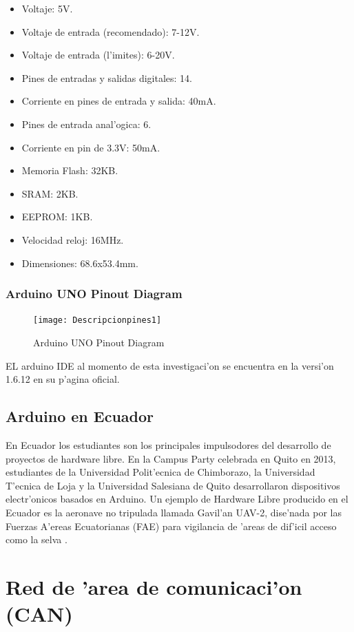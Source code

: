 \begin{itemize}
	\item Voltaje: 5V.
\item Voltaje de entrada (recomendado): 7-12V.
\item Voltaje de entrada (l'imites): 6-20V.
\item Pines de entradas y salidas digitales: 14.
\item Corriente en pines de entrada y salida: 40mA.
\item Pines de entrada anal'ogica: 6.
\item Corriente en pin de 3.3V: 50mA.
\item Memoria Flash: 32KB.
\item SRAM: 2KB.
\item EEPROM: 1KB.
\item Velocidad reloj: 16MHz.
\item Dimensiones: 68.6x53.4mm.
\end{itemize}

\subsubsection{Arduino UNO Pinout Diagram}
\begin{figure}[h]
	\centering
		\texttt{[image: Descripcionpines1]}
	\caption{Arduino UNO Pinout Diagram}
	\label{fig:Descripcionpines}
\end{figure}
EL arduino IDE al momento de esta investigaci'on se encuentra en la versi'on 1.6.12 en su p'agina oficial.

\subsection{Arduino en Ecuador}
En Ecuador los estudiantes son los principales impulsodores del
desarrollo de proyectos de hardware libre. En la Campus Party celebrada en Quito en 2013, estudiantes
de la Universidad Polit'ecnica de Chimborazo, la Universidad T'ecnica de Loja y la
Universidad Salesiana de Quito desarrollaron dispositivos electr'onicos basados en Arduino.
Un ejemplo de Hardware Libre producido en el Ecuador es la aeronave no tripulada llamada Gavil'an UAV-2, dise'nada por las Fuerzas A'ereas Ecuatorianas (FAE) para vigilancia de 'areas de dif'icil acceso como la selva \citep{lazalde}.


\section{Red de 'area de comunicaci'on (CAN)}


